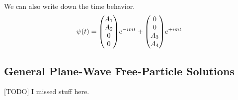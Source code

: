 \documentclass[a4paper,twoside,master.tex]{subfiles}
\begin{document}
We can also write down the time behavior.
\begin{equation}
    \psi(t) = \mqty(A_1\\A_2\\0\\0) e^{- \imath m t} + \mqty(0\\0\\A_3\\A_4)e^{+ \imath m t}
\end{equation}

\subsection{General Plane-Wave Free-Particle Solutions}\label{sub:general_plane-wave_free-particle_solutions}

[TODO] I missed stuff here.
\end{document}
